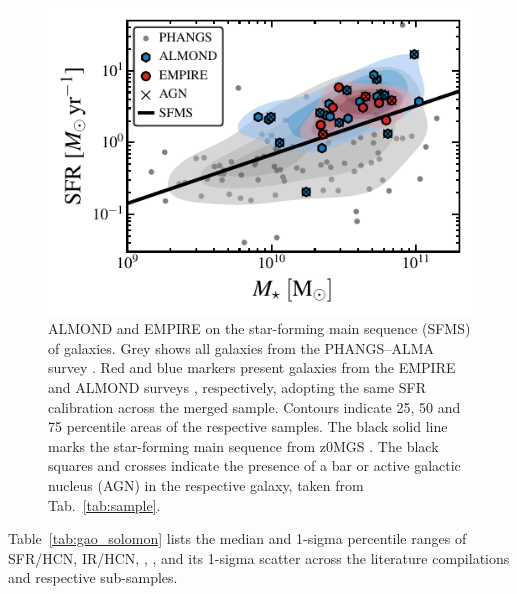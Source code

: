 \documentclass[letter, longauth]{aa} %
\begin{document}
\begin{appendix}
\begin{figure}
\centering
\includegraphics[width=\columnwidth]{Figures/ALMOND+EMPIRE_SFMS_compressed.pdf}
\caption{ALMOND and EMPIRE on the star-forming main sequence (SFMS) of galaxies.
Grey shows all galaxies from the PHANGS--ALMA survey \citep{Leroy2021b}.
Red and blue markers present galaxies from the EMPIRE \citep{Jimenez-Donaire2019} and ALMOND surveys \citep{Neumann2023a}, respectively, adopting the same SFR calibration across the merged sample.
Contours indicate 25, 50 and 75 percentile areas of the respective samples.
The black solid line marks the star-forming main sequence from z0MGS \citep{Leroy2019}.
The black squares and crosses indicate the presence of a bar or active galactic nucleus (AGN) in the respective galaxy, taken from Tab.~\ref{tab:sample}.
}
\label{fig:sfms}
\end{figure}

Table~\ref{tab:gao_solomon} lists the median and 1-sigma percentile ranges of SFR/HCN, IR/HCN, \taudense, \effdense, and its 1-sigma scatter across the literature compilations and respective sub-samples.


\end{appendix}
\end{document}
